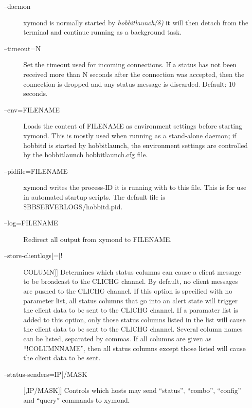 \begin{description}
 

\item[--daemon] xymond is normally started by \emph{hobbitlaunch(8)}
 it will then detach from the terminal and continue running as a background task. 

 

\item[--timeout=N] Set the timeout used for incoming connections. If a status has not been received more than N seconds after the connection was accepted, then the connection is dropped and any status message is discarded. Default: 10 seconds. 

 

\item[--env=FILENAME] Loads the content of FILENAME as environment settings before starting xymond. This is mostly used when running as a stand-alone daemon; if hobbitd is started by hobbitlaunch, the environment settings are controlled by the hobbitlaunch hobbitlaunch.cfg file. 

 

\item[--pidfile=FILENAME] xymond writes the process-ID it is running with to this file. This is for use in automated startup scripts. The default file is \$BBSERVERLOGS/hobbitd.pid. 

 

\item[--log=FILENAME] Redirect all output from xymond to FILENAME. 

 

\item[--store-clientlogs[=[!]COLUMN]] Determines which status columns can cause a client message to be broadcast to the CLICHG channel. By default, no client messages are pushed to the CLICHG channel. If this option is specified with no parameter list, all status columns that go into an alert state will trigger the client data to be sent to the CLICHG channel. If a paramater list is added to this option, only those status columns listed in the list will cause the client data to be sent to the CLICHG channel. Several column names can be listed, separated by commas. If all columns are given as ``!COLUMNNAME'', then all status columns except those listed will cause the client data to be sent. 

 

\item[--status-senders=IP[/MASK][,IP/MASK]] Controls which hosts may send ``status'', ``combo'', ``config'' and ``query'' commands to xymond. 


\end{description}
